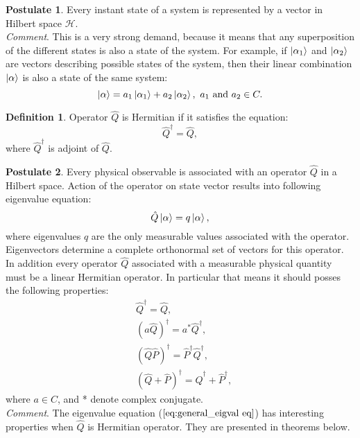 \documentclass[twoside,english]{uiofysmaster}
\theoremstyle{definition}
\newtheorem{defn}{Definition}
\newtheorem{post}{Postulate}
\begin{document}
\begin{post}
	Every instant state of a system is represented by a vector in Hilbert space $\mathscr{H}$.\\
\textit{Comment}. This is a very strong demand, because it means that any superposition of the different states is also a state of the system. For example, if $\ket{\alpha_1}$ and  $\ket{\alpha_2}$ are vectors describing possible states of the system, then their linear combination $\ket{\alpha}$ is also a state of the same system:
\begin{equation*}
\ket{\alpha}=a_1\ket{\alpha_1}+a_2\ket{\alpha_2}, \text{   } a_1\text{  and }  a_2 \in C.
\end{equation*}
\end{post}
\begin{defn}
Operator $\hat{Q}$ is Hermitian if it satisfies the equation:
\begin{equation}
\hat{Q}^\dagger=\hat{Q},
\end{equation}
where $\hat{Q}^\dagger$ is adjoint of $\hat{Q}$.
\end{defn}
\begin{post}\label{postulat2}
	Every physical observable is associated with an operator $\hat{Q}$ in a Hilbert space. Action of the operator on state vector results into following eigenvalue equation:
	\begin{equation}\label{eq:general_eigval eq}
	\hat{Q}\ket{\alpha}= q\ket{\alpha}, 
	\end{equation}
where eigenvalues $q$ are the only measurable values associated with the operator. Eigenvectors determine a complete orthonormal set of vectors for this operator. In addition every operator $\hat{Q}$ associated with a measurable physical quantity must be a linear Hermitian operator. In particular that means it should posses the following properties:
	\begin{align}
	&\hat{Q}^\dagger=\hat{Q},\\
	&(a\hat{Q})^\dagger=a^*\hat{Q}^\dagger,\\
	&(\hat{Q}\hat{P})^\dagger  =\hat{P}^\dagger \hat{Q}^\dagger,\\
	&(\hat{Q}+\hat{P})^\dagger =\hat{Q}^\dagger+\hat{P}^\dagger,
	\end{align}
	where $a \in C$, and * denote complex conjugate.\\
\textit{Comment}. The eigenvalue equation ($\ref{eq:general_eigval eq}$) has interesting properties when $\hat{Q}$ is Hermitian operator. They are presented in theorems below.
\end{post}
\end{document}
